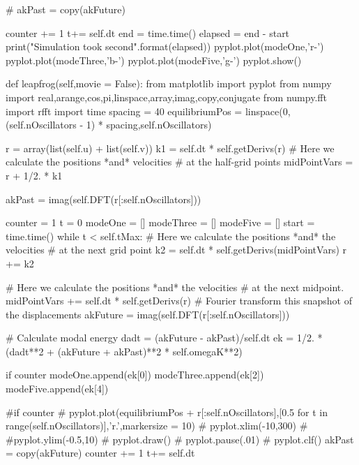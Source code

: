 \begin{enumerate}
\begin{codeexample}
\begin{VerbatimOut}{\listingFile}
         
#            akPast = copy(akFuture)

 
            counter += 1
            t+= self.dt
        end = time.time()
        elapsed = end - start
        print("Simulation took {} second".format(elapsed))
        pyplot.plot(modeOne,'r-')
        pyplot.plot(modeThree,'b-')
        pyplot.plot(modeFive,'g-')
        pyplot.show()


    def leapfrog(self,movie = False):
        from matplotlib import pyplot
        from numpy import real,arange,cos,pi,linspace,array,imag,copy,conjugate
        from numpy.fft import rfft
        import time
        spacing = 40
        equilibriumPos = linspace(0,(self.nOscillators - 1) * spacing,self.nOscillators)

        r = array(list(self.u) + list(self.v))
        k1 = self.dt * self.getDerivs(r)
        # Here we calculate the positions *and* velocities
        # at the half-grid points
        midPointVars = r + 1/2. * k1

        akPast = imag(self.DFT(r[:self.nOscillators]))

        counter = 1
        t = 0
        modeOne = []
        modeThree = []
        modeFive = []
        start = time.time()
        while t < self.tMax:
            # Here we calculate the positions *and* the velocities
            # at the next grid point
            k2 = self.dt * self.getDerivs(midPointVars)
            r += k2

            # Here we calculate the positions *and* the velocities
            # at the next midpoint.
            midPointVars +=  self.dt * self.getDerivs(r)
            # Fourier transform this snapshot of the displacements
            akFuture = imag(self.DFT(r[:self.nOscillators]))

            # Calculate modal energy
            dadt = (akFuture - akPast)/self.dt
            ek = 1/2. * (dadt**2 + (akFuture + akPast)**2  * self.omegaK**2)

            if counter %
                modeOne.append(ek[0])
                modeThree.append(ek[2])
                modeFive.append(ek[4])

            #if counter %
            #    pyplot.plot(equilibriumPos + r[:self.nOscillators],[0.5 for t in range(self.nOscillators)],'r.',markersize = 10)
            #    pyplot.xlim(-10,300)
            #    #pyplot.ylim(-0.5,10)
            #    pyplot.draw()
            #    pyplot.pause(.01)
            #    pyplot.clf()
            akPast = copy(akFuture)
            counter += 1
            t+= self.dt


\end{VerbatimOut}
\end{codeexample}
\end{enumerate}
